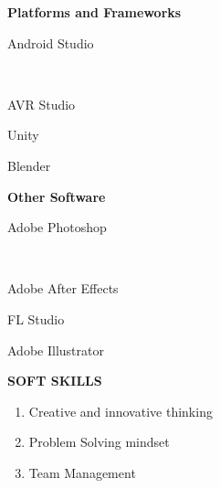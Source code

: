 \documentclass[10pt]{article}
\begin{document}
\begin{minipage}{\textwidth}
\begin{multicols}{2}
\begin{enumerate}
\end{enumerate}



\Large\textbf{{Platforms and Frameworks}}\\
\begin{enumerate}
\normalsize {\item Android Studio}\\
\item AVR Studio\\
\item Unity\\
\item Blender\\

\end{enumerate}

\Large\textbf{{Other Software}}\\
\begin{enumerate}
\normalsize {\item {Adobe Photoshop}}\\
\item Adobe After Effects\\
\item FL Studio\\
\item Adobe Illustrator\\


\end{enumerate}



\end{multicols}


\end{minipage}


\begin{minipage}{\textwidth}
\vspace{3mm}
\begin{huge}
\textbf{\color{theme}SOFT SKILLS}
\end{huge}
\begin{mdframed}[backgroundcolor=theme]
\end{mdframed}

\vspace{1mm}

\color{black}\normalsize{{
\begin{enumerate}
\item Creative and innovative thinking\\
\item Problem Solving mindset\\
\item Team Management\\


\end{enumerate}
}}
\end{minipage}
\end{document}
